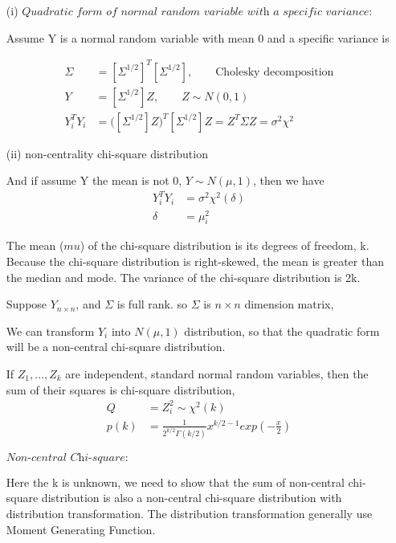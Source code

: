 	\begin{itemize}
	\item [(i)] $\textit{Quadratic form of normal random variable with a specific variance:}$ 
	
Assume Y is a normal random variable with mean 0 and a specific variance is 

\begin{align*}
	\Sigma &= [\Sigma^{1/2}]^T [\Sigma^{1/2}], \qquad \text{Cholesky decomposition} \\
	Y &= [\Sigma^{1/2}] Z, \qquad Z \sim N(0, 1) \\
	Y_i^T Y_i &= \Big([\Sigma^{1/2}] Z \Big)^T [\Sigma^{1/2}] Z= Z^T \Sigma Z = \sigma^2 \chi^2
\end{align*}	

\item [(ii)]  non-centrality chi-square distribution

And if assume Y the mean is not 0, $Y \sim N(\mu, 1)$, then we have
\begin{align*}
	Y_i^T Y_i &= \sigma^2 \chi^2 (\delta) \\
	\delta &= \mu_i^2
\end{align*}	

The mean ($mu$) of the chi-square distribution is its degrees of freedom, k. Because the chi-square distribution is right-skewed, the mean is greater than the median and mode. The variance of the chi-square distribution is 2k. 

Suppose $Y_{n \times n}$, and $\Sigma$ is full rank. so $\Sigma$ is $n \times n$ dimension matrix, 


		
			We can transform $Y_i$ into $N(\mu, 1)$ distribution, so that the quadratic form will be a non-central chi-square distribution. 
		
		If $Z_1, ..., Z_k$ are independent, standard normal random variables, then the sum of their squares is chi-square distribution,
		\begin{align*}
			Q &= Z_i^2 \sim \chi^2(k)\\
			p(k) &= \frac{1}{2^{k/2} \Gamma(k/2)} x^{k/2-1} exp(-\frac{x}{2})
		\end{align*}
	
	 $\textit{Non-central Chi-square:}$ 
		
	Here the k is unknown, we need to show that the sum of non-central chi-square distribution is also a non-central chi-square distribution with distribution transformation. The distribution transformation generally use Moment Generating Function.		
		

\end{itemize}
